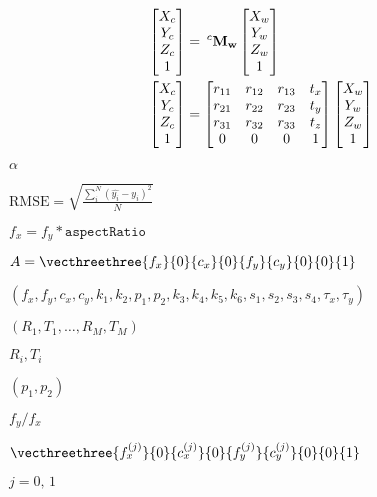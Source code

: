 \documentclass{article}
\begin{document}
\[ \begin{align*} \begin{bmatrix} X_c \\ Y_c \\ Z_c \\ 1 \end{bmatrix} &= \hspace{0.2em} ^{c}\bf{M}_w \begin{bmatrix} X_{w} \\ Y_{w} \\ Z_{w} \\ 1 \end{bmatrix} \\ \begin{bmatrix} X_c \\ Y_c \\ Z_c \\ 1 \end{bmatrix} &= \begin{bmatrix} r_{11} & r_{12} & r_{13} & t_x \\ r_{21} & r_{22} & r_{23} & t_y \\ r_{31} & r_{32} & r_{33} & t_z \\ 0 & 0 & 0 & 1 \end{bmatrix} \begin{bmatrix} X_{w} \\ Y_{w} \\ Z_{w} \\ 1 \end{bmatrix} \end{align*} \]
\pagebreak

$\alpha$
\pagebreak

$ \text{RMSE} = \sqrt{\frac{\sum_{i}^{N} \left ( \hat{y_i} - y_i \right )^2}{N}} $
\pagebreak

$f_x = f_y * \texttt{aspectRatio}$
\pagebreak

$A = \vecthreethree{f_x}{0}{c_x}{0}{f_y}{c_y}{0}{0}{1}$
\pagebreak

$(f_x, f_y, c_x, c_y, k_1, k_2, p_1, p_2, k_3, k_4, k_5, k_6 , s_1, s_2, s_3, s_4, \tau_x, \tau_y)$
\pagebreak

$(R_1, T_1, \dotsc , R_M, T_M)$
\pagebreak

$R_i, T_i$
\pagebreak

$(p_1, p_2)$
\pagebreak

$f_y/f_x$
\pagebreak

$\vecthreethree{f_x^{(j)}}{0}{c_x^{(j)}}{0}{f_y^{(j)}}{c_y^{(j)}}{0}{0}{1}$
\pagebreak

$j = 0,\, 1$
\pagebreak
\end{document}
